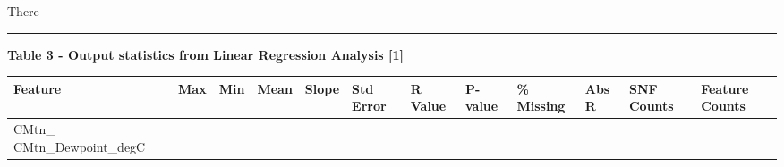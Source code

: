 \documentclass[11pt]{article}
\begin{document}
There

\begin{center}\rule{0.5\linewidth}{\linethickness}\end{center}

\textbf{Table 3 - Output statistics from Linear Regression Analysis
{[}1{]}}

\begin{longtable}[]{@{}llllllllllll@{}}
\toprule
\begin{minipage}[b]{0.18\columnwidth}\raggedright\strut
Feature\strut
\end{minipage} & \begin{minipage}[b]{0.04\columnwidth}\raggedright\strut
Max\strut
\end{minipage} & \begin{minipage}[b]{0.04\columnwidth}\raggedright\strut
Min\strut
\end{minipage} & \begin{minipage}[b]{0.04\columnwidth}\raggedright\strut
Mean\strut
\end{minipage} & \begin{minipage}[b]{0.04\columnwidth}\raggedright\strut
Slope\strut
\end{minipage} & \begin{minipage}[b]{0.05\columnwidth}\raggedright\strut
Std Error\strut
\end{minipage} & \begin{minipage}[b]{0.04\columnwidth}\raggedright\strut
R Value\strut
\end{minipage} & \begin{minipage}[b]{0.04\columnwidth}\raggedright\strut
P-value\strut
\end{minipage} & \begin{minipage}[b]{0.05\columnwidth}\raggedright\strut
\% Missing\strut
\end{minipage} & \begin{minipage}[b]{0.05\columnwidth}\raggedright\strut
Abs R\strut
\end{minipage} & \begin{minipage}[b]{0.05\columnwidth}\raggedright\strut
SNF Counts\strut
\end{minipage} & \begin{minipage}[b]{0.07\columnwidth}\raggedright\strut
Feature Counts\strut
\end{minipage}\tabularnewline
\midrule
\endhead
\begin{minipage}[t]{0.18\columnwidth}\raggedright\strut
CMtn\_ CMtn\_Dewpoint\_degC\strut

\end{minipage}
\end{longtable}
\end{document}
